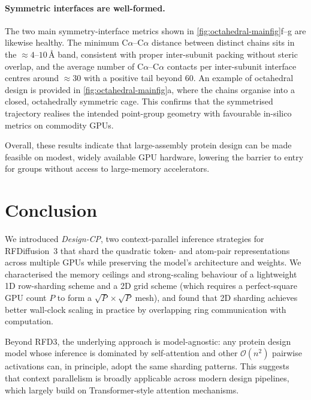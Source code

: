 \documentclass{article}
\theoremstyle{plain}
\theoremstyle{definition}
\theoremstyle{remark}
\begin{document}
\paragraph{Symmetric interfaces are well-formed.} The two main symmetry-interface metrics shown in \cref{fig:octahedral-mainfig}f--g are likewise healthy. The minimum C$\alpha$--C$\alpha$ distance between distinct chains sits in the $\approx 4$--$10$\,\AA{} band, consistent with proper inter-subunit packing without steric overlap, and the average number of C$\alpha$--C$\alpha$ contacts per inter-subunit interface centres around $\approx 30$ with a positive tail beyond $60$. An example of octahedral design is provided in \cref{fig:octahedral-mainfig}a, where the chains organise into a closed, octahedrally symmetric cage. This confirms that the symmetrised trajectory realises the intended point-group geometry with favourable in-silico metrics on commodity GPUs.

Overall, these results indicate that large-assembly protein design can be made feasible on modest, widely available GPU hardware, lowering the barrier to entry for groups without access to large-memory accelerators.

\section{Conclusion}
\label{sec:conclusion}

We introduced \emph{Design-CP}, two context-parallel inference strategies for RFDiffusion~3 that shard the quadratic token- and atom-pair representations across multiple GPUs while preserving the model's architecture and weights. We characterised the memory ceilings and strong-scaling behaviour of a lightweight 1D row-sharding scheme and a 2D grid scheme (which requires a perfect-square GPU count $P$ to form a $\sqrt{P}\times\sqrt{P}$ mesh), and found that 2D sharding achieves better wall-clock scaling in practice by overlapping ring communication with computation.

Beyond RFD3, the underlying approach is model-agnostic: any protein design model whose inference is dominated by self-attention and other $\mathcal{O}(n^2)$ pairwise activations can, in principle, adopt the same sharding patterns. This suggests that context parallelism is broadly applicable across modern design pipelines, which largely build on Transformer-style attention mechanisms.
\end{document}
